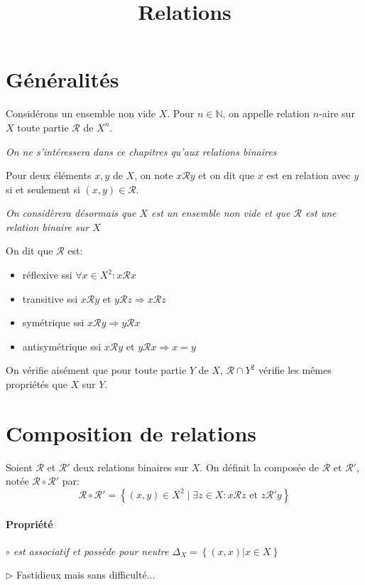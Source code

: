 \documentclass{scrartcl}
\title{Relations}
\author{}
\date{}
\begin{document}
	\maketitle
	\section{Généralités}
		Considérons un ensemble non vide $X$. Pour $n\in\mathbb{N}$, on appelle relation $n$-aire sur $X$
		toute partie $\mathcal{R}$ de $X^n$. 

		\begin{center}\textsl{On ne s'intéressera dans ce chapitres qu'aux relations binaires}\end{center}

		Pour deux éléments $x,y$ de $X$, on note $x\mathcal{R}y$ et on dit que $x$ est en relation avec $y$ si et seulement si
		$(x,y)\in \mathcal{R}$.

		\begin{center}\textsl{On considèrera désormais que $X$ est un ensemble non vide et que $\mathcal{R}$ est une relation binaire sur $X$}\end{center}

		On dit que $\mathcal{R}$ est:
		\begin{itemize}
			\item réflexive ssi $\forall x \in X^2: x\mathcal{R}x$
			\item transitive ssi $x\mathcal{R}y$ et $y\mathcal{R}z \Rightarrow x\mathcal{R}z$
			\item symétrique ssi $x\mathcal{R}y \Rightarrow y\mathcal{R}x$
			\item antisymétrique ssi $x\mathcal{R}y$ et $y\mathcal{R}x \Rightarrow x = y$ 
		\end{itemize}

		On vérifie aisément que pour toute partie $Y$ de $X$, $\mathcal{R}\cap Y^2$ vérifie les mêmes propriétés que $X$ sur $Y$.

	\section{Composition de relations}
		Soient $\mathcal{R}$ et $\mathcal{R}'$ deux relations binaires sur $X$. 
		On définit la composée de $\mathcal{R}$ et $\mathcal{R}'$, notée $\mathcal{R} \circ \mathcal{R}'$ par:
		\[
			\mathcal{R}\circ\mathcal{R}' = \left\{(x,y) \in X^2 \; \big| \; \exists z \in X: x\mathcal{R}z \text{ et } z\mathcal{R}'y \right\}
		\]
		
		\paragraph{Propriété} \textsl{$\circ$ est associatif et possède pour neutre $\Delta_X = \left\{(x,x) \big| x\in X\right\}$}
		\begin{demo}
			\item [$\triangleright$] Fastidieux mais sans difficulté...
		\end{demo}
\end{document}
